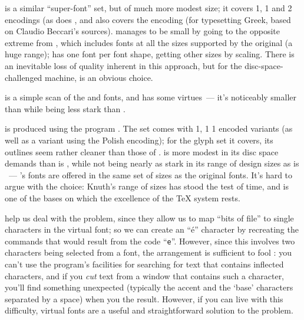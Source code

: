  is a similar ``super-font'' set, but of much more
modest size; it covers 1, 1 and 2
encodings (as does , and also covers the 
encoding (for typesetting Greek, based on Claudio Beccari's \MF{}
sources).   manages to be small by going to the
opposite extreme from , which includes fonts at all
the sizes supported by the original  (a huge range);
 has one font per font shape, getting other sizes by
scaling.  There is an inevitable loss of quality inherent in this
approach, but for the disc-space-challenged machine, 
is an obvious choice.

 is a simple scan of the  and 
fonts, and has some virtues~--- it's noticeably smaller than
 while being less stark than .

  is produced using the
program .  The
  set comes with 1, 1
1 encoded variants (as well as a variant using the Polish
 encoding); for the glyph set it covers, its outlines seem
rather cleaner than those of .  
 is more modest in its disc space demands than is
, while not being nearly as stark in its range of
design sizes as is ~---  
's fonts are offered in the same set of sizes as the
original  fonts.  It's hard to argue with the choice:
Knuth's range of sizes has stood the test of time, and is one of the
bases on which the excellence of the \TeX{} system rests.

 help us deal with the problem,
since they allow us to map ``bits of  file'' to single
characters in the virtual font; so we can create an ``\'e'' character
by recreating the  commands that would result from the code
``\texttt{e}''.  However, since this involves two characters being
selected from a font, the arrangement is sufficient to fool
 : you can't use the program's
facilities for searching for text that contains inflected characters,
and if you \emph{cut} text from a window that contains such a
character, you'll find something unexpected (typically the accent and
the `base' characters separated by a space) when you 
the result.  However, if you can live with this difficulty, virtual
fonts are a useful and straightforward solution to the problem.

